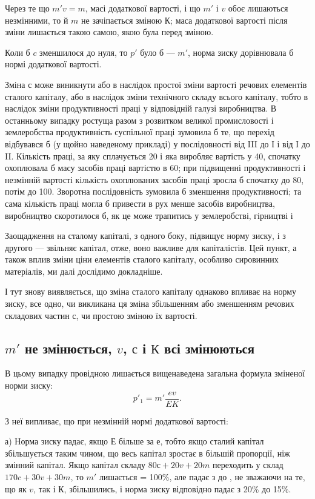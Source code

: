 
Через те що  $m'v = m$, масі додаткової вартості, і що $m'$ і $v$
обоє лишаються незмінними, то й $m$ не зачіпається зміною $К$;
маса додаткової вартості після зміни лишається такою самою,
якою була перед зміною.

Коли б $c$ зменшилося до нуля, то $p'$ було б — $m'$, норма зиску
дорівнювала б нормі додаткової вартості.

Зміна $с$ може виникнути або в наслідок простої зміни вартості
речових елементів сталого капіталу, або в наслідок зміни технічного
складу всього капіталу, тобто в наслідок зміни продуктивності
праці у відповідній галузі виробництва. В останньому
випадку ростуща разом з розвитком великої промисловості і
землеробства продуктивність суспільної праці зумовила б те, що
перехід відбувався б (у щойно наведеному прикладі) у послідовності
від III до І і від І до II. Кількість праці, за яку сплачується
20 і яка виробляє вартість у 40, спочатку охоплювала б масу засобів
праці вартістю в 60; при підвищенні продуктивності і незмінній
вартості кількість охоплюваних засобів праці зросла б спочатку
до 80, потім до 100. Зворотна послідовність зумовила б
зменшення продуктивності; та сама кількість праці могла б привести
в рух менше засобів виробництва, виробництво скоротилося
б, як це може трапитись у землеробстві, гірництві і~

Заощадження на сталому капіталі, з одного боку, підвищує
норму зиску, і з другого — звільняє капітал, отже, воно важливе
для капіталістів. Цей пункт, а також вплив зміни ціни елементів
сталого капіталу, особливо сировинних матеріалів, ми далі дослідимо
докладніше.

І тут знову виявляється, що зміна сталого капіталу однаково
впливає на норму зиску, все одно, чи викликана ця зміна збільшенням
або зменшенням речових складових частин $с$, чи простою
зміною їх вартості.

\subsection{$m'$ не змінюється, $v$, $с$ і $К$ всі змінюються}

В цьому випадку провідною лишається вищенаведена загальна
формула зміненої норми зиску:
\[
p'_1 = m'\frac{ev}{EK}.
\]

З неї випливає, що при незмінній нормі додаткової вартості:

а) Норма зиску падає, якщо $Е$ більше за $е$, тобто якщо сталий
капітал збільшується таким чином, що весь капітал зростає
в більшій пропорції, ніж змінний капітал. Якщо капітал складу
$80 с + 20 v + 20 m$ переходить у склад $170 c + 30 v + 30 m$, то $m'$
лишається = 100\%, але падає з  до , не
зважаючи на те,
що як $v$, так і $К$, збільшились, і норма зиску відповідно падає з
20\% до 15\%.
